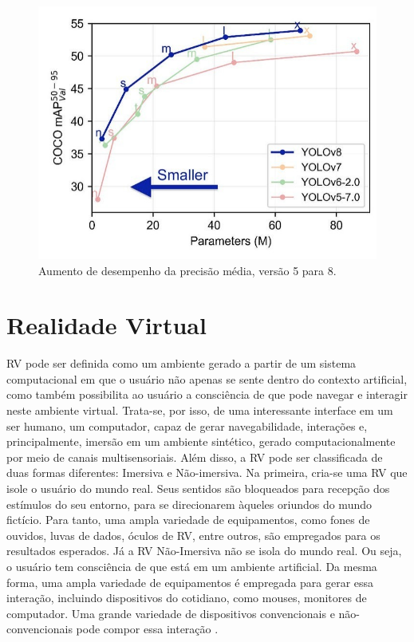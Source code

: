 \begin{figure}[!h]
    \center
    \begin{minipage}{0.9\linewidth}
    \center
    \captionsetup{justification=centering,margin=0.5cm,font=small}
    \includegraphics[width=0.7\linewidth]{img/cap2/precisao.png}
    \caption{ Aumento de desempenho da precisão média, versão 5 para 8.  \cite{ultralytics2023yolo}} \label{subfig:precisao}
    \end{minipage}
\end{figure}

\section{Realidade Virtual}
\label{sec:precisaorecall}

RV pode ser definida como um ambiente gerado a partir de um sistema computacional em que o usuário não apenas se sente dentro do contexto artificial, como também possibilita ao usuário a consciência de que pode navegar e interagir neste ambiente virtual. Trata-se, por isso, de uma interessante interface em um ser humano, um computador, capaz de gerar navegabilidade, interações e, principalmente, imersão em um ambiente sintético, gerado computacionalmente por meio de canais multisensoriais. Além disso, a RV pode ser classificada de duas formas diferentes: Imersiva e Não-imersiva. Na primeira, cria-se uma RV que isole o usuário do mundo real. Seus sentidos são bloqueados para recepção dos estímulos do seu entorno, para se direcionarem àqueles oriundos do mundo fictício. Para tanto, uma ampla variedade de equipamentos, como fones de ouvidos, luvas de dados, óculos de RV, entre outros, são empregados para os resultados esperados. Já a RV Não-Imersiva não se isola do mundo real. Ou seja, o usuário tem consciência de que está em um ambiente artificial. Da mesma forma, uma ampla variedade de equipamentos é empregada para gerar essa interação, incluindo dispositivos do cotidiano, como mouses, monitores de computador. Uma grande variedade de dispositivos convencionais e não-convencionais pode compor  essa interação \cite {cardoso2007tecnologias}.

